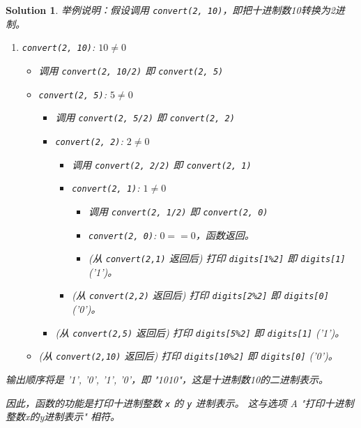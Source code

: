 \documentclass[UTF8]{report}
\newtheorem{solution}{Solution}
\theoremstyle{MyLineTheoremStyle} %
\theoremstyle{MyBlockTheoremStyle} %
\theoremstyle{MySubsubsectionStyle} %
\begin{document}
\begin{solution}
举例说明：假设调用 \texttt{convert(2, 10)}，即把十进制数10转换为2进制。
\begin{enumerate}
    \item \texttt{convert(2, 10)}: $10 \neq 0$
    \begin{itemize}
        \item 调用 \texttt{convert(2, 10/2)} 即 \texttt{convert(2, 5)}
        \item \texttt{convert(2, 5)}: $5 \neq 0$
        \begin{itemize}
            \item 调用 \texttt{convert(2, 5/2)} 即 \texttt{convert(2, 2)}
            \item \texttt{convert(2, 2)}: $2 \neq 0$
            \begin{itemize}
                \item 调用 \texttt{convert(2, 2/2)} 即 \texttt{convert(2, 1)}
                \item \texttt{convert(2, 1)}: $1 \neq 0$
                \begin{itemize}
                    \item 调用 \texttt{convert(2, 1/2)} 即 \texttt{convert(2, 0)}
                    \item \texttt{convert(2, 0)}: $0 == 0$，函数返回。
                    \item (从 \texttt{convert(2,1)} 返回后) 打印 \texttt{digits[1\%2]} 即 \texttt{digits[1]} ('1')。
                \end{itemize}
                \item (从 \texttt{convert(2,2)} 返回后) 打印 \texttt{digits[2\%2]} 即 \texttt{digits[0]} ('0')。
            \end{itemize}
            \item (从 \texttt{convert(2,5)} 返回后) 打印 \texttt{digits[5\%2]} 即 \texttt{digits[1]} ('1')。
        \end{itemize}
        \item (从 \texttt{convert(2,10)} 返回后) 打印 \texttt{digits[10\%2]} 即 \texttt{digits[0]} ('0')。
    \end{itemize}
\end{enumerate}
输出顺序将是 '1', '0', '1', '0'，即 "1010"，这是十进制数10的二进制表示。

因此，函数的功能是打印十进制整数 \texttt{x} 的 \texttt{y} 进制表示。
这与选项 A "打印十进制整数x的y进制表示" 相符。
\end{solution}
\end{document}
